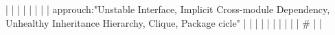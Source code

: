 |    |            |      |                                                                      |                                                                                                                                                                          |                                                                                                                                                                                                                                                            |                                                                                                                                                                                                                                                                      |  approuch:"Unstable Interface, Implicit Cross-module Dependency, Unhealthy Inheritance Hierarchy, Clique, Package cicle"                                                                                                                                                                                 |                                                                                                                                                                                                                                                                                                                                                                                                                                                                                              |
|    |            |      |                                                                      |                                                                                                                                                                          |                                                                                                                                                                                                                                                            |                                                                                                                                                                                                                                                                      |  #                                                                                                                                                                                                                                                                                                       |                                                                                                                                                                                                                                                                                                                                                                                                                                                                                              |
